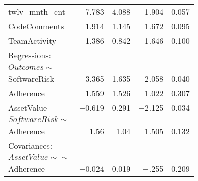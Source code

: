 \begin{table}
\begin{center}
\begin{tabular}{l|rrrr}
		    twlv\_mnth\_cnt\_  &  7.783  &  4.088  &  1.904 &   0.057\\
		    CodeComments    &  1.914  &  1.145  &  1.672  &  0.095\\
		    TeamActivity    &  1.386  &  0.842 &   1.646 &   0.100\\	
			                
			Regressions:  & & & & \\  
			$Outcomes \sim$         & & & & \\                                     
			SoftwareRisk   &  3.365 &   1.635 & 2.058 &   0.040 \\
			Adherence       &  $-$1.559  & 1.526  &  $-$1.022  &  0.307\\
			AssetValue     &   $-0$.619  &  0.291  &  $-$2.125 &   0.034\\
			$SoftwareRisk \sim$        & & & & \\                                  
			Adherence     &    1.56 &   1.04  &  1.505 &   0.132\\
			Covariances:  & & & & \\  
			$AssetValue \sim\sim$          & & & & \\                                 
			Adherence     &    $-$0.024 &   0.019  &  $-$.255 &   0.209\\
		\end{tabular}
	\end{center}
\end{table}


